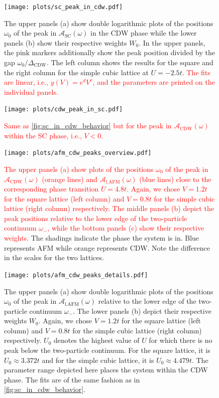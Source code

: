 \documentclass[
    reprint, 
    aps,
    preprintnumbers,
    twocolumn,
    prb,
    superscriptaddress
]{revtex4-2}
\newcommand{\spectral}[1]{\mathcal{A}_\text{#1}  (\omega)}
\begin{document}
\begin{figure}
    \centering
    \texttt{[image: plots/sc\_peak\_in\_cdw.pdf]}
    \caption{The upper panels (a) show double logarithmic plots of the positions $\omega_0$ of the peak in $\spectral{SC}$ in the CDW phase while the lower panels (b) show their respective weights $W_0$.
    In the upper panels, the pink markers additionally show the peak position divided by the gap $\omega_0 / \Delta_\text{CDW}$.
    The left column shows the results for the square and the right column for the simple cubic lattice at $U=-2.5t$.
    \textcolor{red}{The fits are linear, i.e., $y(V) = e^d V^c$, and the parameters are printed on the individual panels.}}
    \label{fig:sc_in_cdw_behavior}
\end{figure}

\begin{figure}
    \centering
    \texttt{[image: plots/cdw\_peak\_in\_sc.pdf]}
    \caption{\textcolor{red}{Same as \autoref{fig:sc_in_cdw_behavior} but for the peak in $\spectral{CDW}$ within the SC phase, i.e., $V<0$.}}
    \label{fig:cdw_in_sc_behavior}
\end{figure}

\begin{figure}
    \centering
    \texttt{[image: plots/afm\_cdw\_peaks\_overview.pdf]}
    \caption{\textcolor{red}{The upper panels (a) show plots of the positions $\omega_0$ of the peak in $\spectral{CDW}$ (orange lines) and $\spectral{l.AFM}$ (blue lines) close to the corresponding phase transition $U = 4.8t$.
    Again, we chose $V=1.2t$ for the square lattice (left column) and $V=0.8t$ for the simple cubic lattice (right column) respectively.
    The middle panels (b) depict the peak positions relative to the lower edge of the two-particle continuum $\omega_-$, while the bottom panels (c) show their respective weights.}
    The shadings indicate the phase the system is in. Blue represents AFM while orange represents CDW.
    Note the difference in the scales for the two lattices.}
    \label{fig:afm_cdw_peaks_overview}
\end{figure}

\begin{figure}
    \centering
    \texttt{[image: plots/afm\_cdw\_peaks\_details.pdf]}
    \caption{The upper panels (a) show double logarithmic plots of the positions $\omega_0$ of the peak in $\spectral{l.AFM}$ relative to the lower edge of the two-particle continuum $\omega_-$.
    The lower panels (b) depict their respective weights $W_0$.
    Again, we chose $V=1.2t$ for the square lattice (left column) and $V=0.8t$ for the simple cubic lattice (right column) respectively.
    $U_0$ denotes the highest value of $U$ for which there is no peak below the two-particle continuum.
    For the square lattice, it is $U_0 \approx 3.372t$ and for the simple cubic lattice, it is $U_0 \approx 4.479t$.
    The parameter range depicted here places the system within the CDW phase.
    The fits are of the same fashion as in \autoref{fig:sc_in_cdw_behavior}.}
    \label{fig:afm_cdw_peaks_details}
\end{figure}
\end{document}
